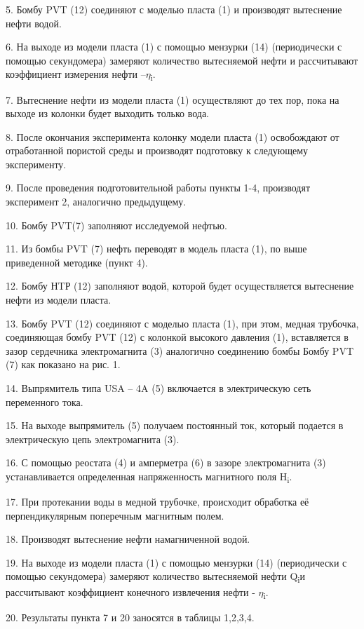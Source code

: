 5. Бомбу PVT (12) соединяют с моделью пласта (1) и производят вытеснение
нефти водой.

6. На выходе из модели пласта (1) с помощью мензурки (14) (периодически
с помощью секундомера) замеряют количество вытесняемой нефти и
рассчитывают коэффициент измерения нефти --\(\eta\)\textsubscript{i}.

7. Вытеснение нефти из модели пласта (1) осуществляют до тех пор, пока
на выходе из колонки будет выходить только вода.

8. После окончания эксперимента колонку модели пласта (1) освобождают от
отработанной пористой среды и производят подготовку к следующему
эксперименту.

9. После проведения подготовительной работы пункты 1-4, производят
эксперимент 2, аналогично предыдущему.

10. Бомбу PVT(7) заполняют исследуемой нефтью.

11. Из бомбы PVT (7) нефть переводят в модель пласта (1), по выше
приведенной методике (пункт 4).

12. Бомбу НTР (12) заполняют водой, которой будет осуществляется
вытеснение нефти из модели пласта.

13. Бомбу PVT (12) соединяют с моделью пласта (1), при этом, медная
трубочка, соединяющая бомбу PVT (12) с колонкой высокого давления (1),
вставляется в зазор сердечника электромагнита (3) аналогично соединению
бомбы Бомбу PVT (7) как показано на рис. 1.

14. Выпрямитель типа USA -- 4A (5) включается в электрическую сеть
переменного тока.

15. На выходе выпрямитель (5) получаем постоянный ток, который подается
в электрическую цепь электромагнита (3).

16. С помощью реостата (4) и амперметра (6) в зазоре электромагнита (3)
устанавливается определенная напряженность магнитного поля
H\textsubscript{i}.

17. При протекании воды в медной трубочке, происходит обработка её
перпендикулярным поперечным магнитным полем.

18. Производят вытеснение нефти намагниченной водой.

19. На выходе из модели пласта (1) с помощью мензурки (14) (периодически
с помощью секундомера) замеряют количество вытесняемой нефти
Q\textsubscript{i}и рассчитывают коэффициент конечного извлечения нефти
- \(\eta\)\textsubscript{i}.

20. Результаты пункта 7 и 20 заносятся в таблицы 1,2,3,4.

